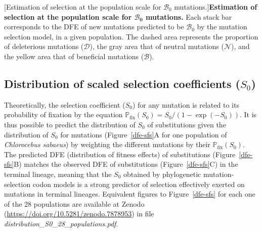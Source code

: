 \documentclass{article}
\newcommand{\proba}{\mathbb{P}}
\newcommand{\Sphy}{S_{0}}
\newcommand{\SphyBen}{\mathcal{B}_0}
\newcommand{\SpopDel}{\mathcal{D}}
\newcommand{\SpopNeu}{\mathcal{N}}
\newcommand{\SpopBen}{\mathcal{B}}
\begin{document}
\begin{center}
\begin{minipage}{0.75\linewidth}
\begin{minipage}{0.09\linewidth}
            \end{minipage}
        \end{minipage}
    [Estimation of selection at the population scale for $\SphyBen$ mutations.]{\textbf{Estimation of selection at the population scale for $\bm{\SphyBen}$ mutations.} Each stack bar corresponds to the DFE of new mutations predicted to be $\SphyBen$ by the mutation selection model, in a given population. The dashed area represents the proportion of deleterious mutations ($\SpopDel$), the gray area that of neutral mutations ($\SpopNeu$), and the yellow area that of beneficial mutations ($\SpopBen$).\label{fig:pop-pos}}
    \end{center}

    \subsection{Distribution of scaled selection coefficients (\texorpdfstring{$\Sphy$}{S₀})}\label{subsec:expectedDFE}

    Theoretically, the selection coefficient ($\Sphy$) for any mutation is related to its probability of fixation by the equation $\proba_{\text{fix}} (\Sphy) = \Sphy/(1-\exp(-\Sphy)) $.
    It is thus possible to predict the distribution of $\Sphy$ of substitutions given the distribution of $\Sphy$ for mutations (Figure~\ref{dfe-sfs}A for one population of \textit{Chlorocebus sabaeus}) by weighting the different mutations by their $\proba_{\text{fix}} (\Sphy)$.
    The predicted DFE (distribution of fitness effects) of substitutions (Figure~\ref{dfe-sfs}B) matches the observed DFE of substitutions (Figure~\ref{dfe-sfs}C) in the terminal lineage, meaning that the $\Sphy$ obtained by phylogenetic mutation-selection codon models is a strong predictor of selection effectively exerted on mutations in terminal lineages.
    Equivalent figures to Figure~\ref{dfe-sfs} for each one of the 28 populations are available at Zenodo (\url{https://doi.org/10.5281/zenodo.7878953}) in file \textit{distribution\_S0\_28\_populations.pdf}.\\
\end{document}
